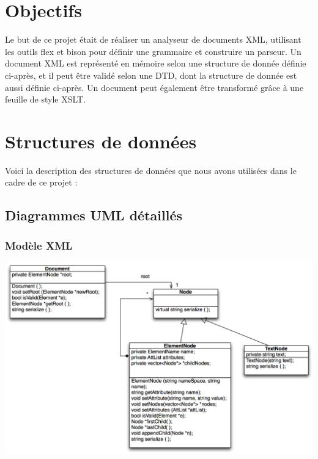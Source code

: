 
\section{Objectifs}

Le but de ce projet était de réaliser un analyseur de documents XML, utilisant les outils flex et bison pour définir une grammaire et construire un parseur. Un document XML est représenté en mémoire selon une structure de donnée définie ci-après, et il peut être validé selon une DTD, dont la structure de donnée est aussi définie ci-après. Un document peut également être transformé grâce à une feuille de style XSLT.

\section{Structures de données}

Voici la description des structures de données que nous avons utilisées dans le cadre de ce projet :

\subsection{Diagrammes UML détaillés}

\subsubsection{Modèle XML}

\medskip
\begin {center}
\includegraphics[width=\textwidth]{UMLXML.png}
\end {center}
\medskip

